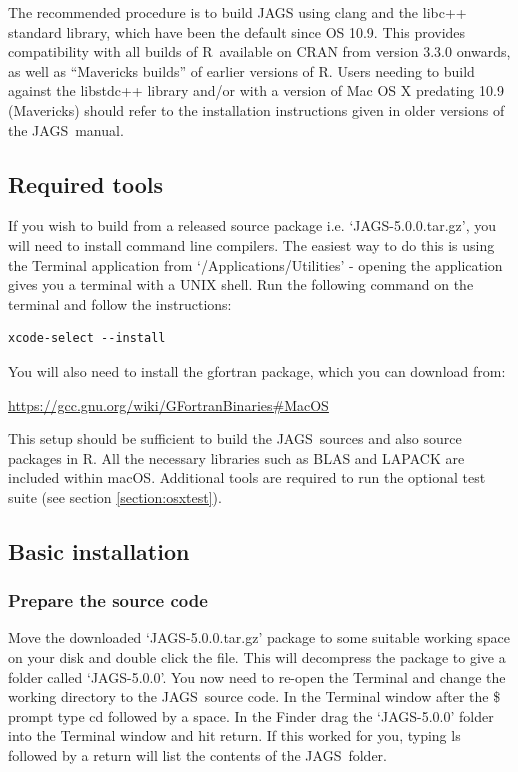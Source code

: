 \documentclass[11pt, a4paper, titlepage]{article}
\newcommand{\release}{5.0.0}
\newcommand{\JAGS}{\textsf{JAGS}}
\newcommand{\R}{\textsf{R}}
\newcommand{\code}[1]{{\bgroup{\normalfont\ttfamily #1}\egroup}}
\newcommand{\file}[1]{{`\normalfont\textsf{#1}'}}
\begin{document}
The recommended procedure is to build JAGS using clang and the libc++ 
standard library, which have been the default since OS 10.9.  This provides 
compatibility with all builds of \R\ available on CRAN from version 3.3.0 
onwards, as well as ``Mavericks builds'' of earlier versions of \R.  Users 
needing to build against the libstdc++ library and/or with a version of 
Mac OS X predating 10.9 (Mavericks) should refer to the installation 
instructions given in older versions of the \JAGS~manual.

\subsection{Required tools}

If you wish to build from a released source package i.e.
\file{JAGS-\release.tar.gz}, you will need to install command line compilers. 
The easiest way to do this is using the Terminal application from 
\file{/Applications/Utilities} - opening the application gives you a terminal 
with a UNIX shell.  Run the following command on the terminal and follow the
instructions:

\begin{verbatim}
xcode-select --install
\end{verbatim}


You will also need to install the gfortran package, which you 
can download from:

\url{https://gcc.gnu.org/wiki/GFortranBinaries#MacOS}

This setup should be sufficient to build the \JAGS\ sources and also source
packages in R.  All the necessary libraries such as BLAS and LAPACK are
included within macOS.  Additional tools are required to run the optional 
test suite (see section \ref{section:osxtest}).


\subsection{Basic installation}


\subsubsection{Prepare the source code}

Move the downloaded \file{JAGS-\release.tar.gz} package to some suitable
working space on your disk and double click the file.  This will
decompress the package to give a folder called \file{JAGS-\release}.  
You now need to re-open the Terminal and
change the working directory to the \JAGS\ source code. In the Terminal
window after the \$ prompt type \code{cd} followed by a space.  In the Finder
drag the \file{JAGS-\release} folder into the Terminal window and hit return.  If this
worked for you, typing \code{ls} followed by a return will list the contents
of the \JAGS\ folder.
\end{document}
